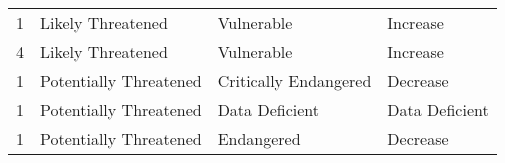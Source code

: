 \begin{table}
{\begin{tabular}{llll}
1                                                              & Likely Threatened                                                                                                                                        & Vulnerable                                                                                                                                                                                                             & Increase                                                                                                        \\
4                                                              & Likely Threatened                                                                                                                                        & Vulnerable                                                                                                                                                                                                             & Increase                                                                                                        \\
1                                                              & Potentially Threatened                                                                                                                                   & Critically Endangered                                                                                                                                                                                                  & Decrease                                                                                                        \\
1                                                              & Potentially Threatened                                                                                                                                   & Data Deficient                                                                                                                                                                                                         & Data Deficient                                                                                                  \\
1                                                              & Potentially Threatened                                                                                                                                   & Endangered                                                                                                                                                                                                             & Decrease                                                                                                        \\

\end{tabular}}
\end{table}
